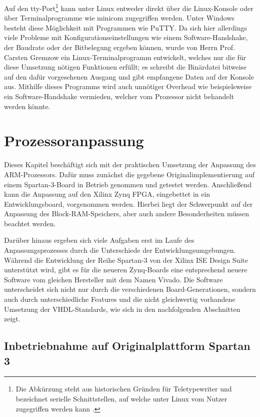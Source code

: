 \documentclass[11pt,a4paper,titlepage]{article}
\begin{document}
Auf den tty-Port\footnote{Die Abkürzung steht aus historischen Gründen für Teletypewriter und bezeichnet serielle Schnittstellen, auf welche unter Linux vom Nutzer zugegriffen werden kann \cite[S. 26]{Linux-tty}.} kann unter Linux entweder direkt über die Linux-Konsole oder über Terminalprogramme wie minicom zugegriffen werden. Unter Windows besteht diese Möglichkeit mit Programmen wie PuTTY. Da sich hier allerdings viele Probleme mit Konfigurationseinstellungen wie einem Software-Handshake, der Baudrate oder der Bitbelegung ergeben können, wurde von Herrn Prof. Carsten Gremzow ein Linux-Terminalprogramm entwickelt, welches nur die für diese Umsetzung nötigen Funktionen erfüllt; es schreibt die Binärdatei bitweise auf den dafür vorgesehenen Ausgang und gibt empfangene Daten auf der Konsole aus. Mithilfe dieses Programms wird auch unnötiger Overhead wie beispielsweise ein Software-Handshake vermieden, welcher vom Prozessor nicht behandelt werden könnte.

\newpage
\section{Prozessoranpassung}

Dieses Kapitel beschäftigt sich mit der praktischen Umsetzung der Anpassung des ARM-Prozessors. Dafür muss zunächst die gegebene Originalimplementierung auf einem Spartan-3-Board in Betrieb genommen und getestet werden. Anschließend kann die Anpassung auf den Xilinx Zynq FPGA, eingebettet in ein Entwicklungsboard, vorgenommen werden. Hierbei liegt der Schwerpunkt auf der Anpassung des Block-RAM-Speichers, aber auch andere Besonderheiten müssen beachtet werden.

Darüber hinaus ergeben sich viele Aufgaben erst im Laufe des Anpassungsprozesses durch die Unterschiede der Entwicklungsumgebungen. Während die Entwicklung der Reihe Spartan-3 von der Xilinx ISE Design Suite \cite{ISE} unterstützt wird, gibt es für die neueren Zynq-Boards eine entsprechend neuere Software vom gleichen Hersteller mit dem Namen Vivado. Die Software unterscheidet sich nicht nur durch die verschiedenen Board-Generationen, sondern auch durch unterschiedliche Features und die nicht gleichwertig vorhandene Umsetzung der VHDL-Standards, wie sich in den nachfolgenden Abschnitten zeigt.

\subsection{Inbetriebnahme auf Originalplattform Spartan 3}
\end{document}
